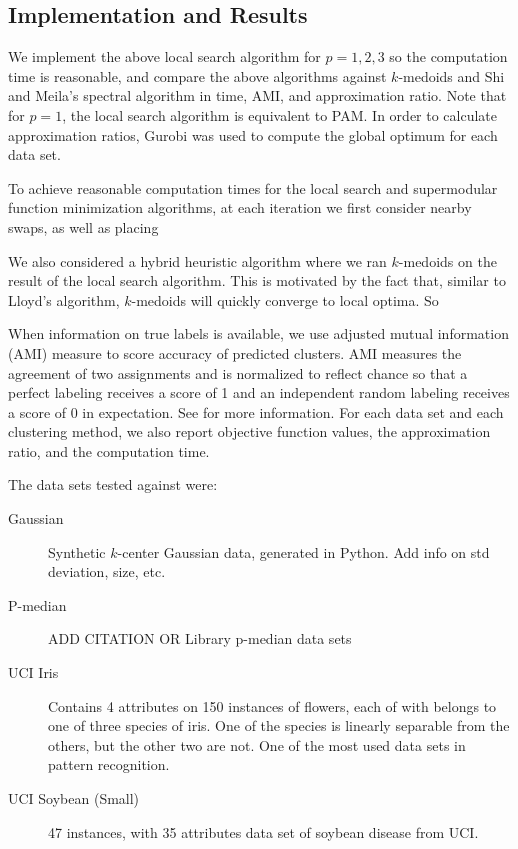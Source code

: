 \documentclass{article}
\begin{document}
\subsection{Implementation and Results}

We implement the above local search algorithm for $p=1, 2, 3$ so the computation time is reasonable, and compare the above algorithms against $k$-medoids and Shi and Meila's spectral algorithm in time, AMI, and approximation ratio.  Note that for $p=1$, the local search algorithm is equivalent to PAM.  In order to calculate approximation ratios, Gurobi was used to compute the global optimum for each data set.

To achieve reasonable computation times for the local search and supermodular function minimization algorithms, at each iteration we first consider nearby swaps, as well as placing 

We also considered a hybrid heuristic algorithm where we ran $k$-medoids on the result of the local search algorithm.  This is motivated by the fact that, similar to Lloyd's algorithm, $k$-medoids will quickly converge to local optima.  So 

When information on true labels is available, we use adjusted mutual information (AMI) measure to score accuracy of predicted clusters. AMI measures the agreement of two assignments and is normalized to reflect chance so that a perfect labeling receives a score of 1 and an independent random labeling receives a score of 0 in expectation.  See \cite{Vinh} for more information. For each data set and each clustering method, we also report objective function values, the approximation ratio, and the computation time. 

The data sets tested against were:
\begin{description}
\item[Gaussian] Synthetic $k$-center Gaussian data, generated in Python.  Add info on std deviation, size, etc.
\item[P-median] ADD CITATION OR Library p-median data sets
\item[UCI Iris] \cite{Iris} Contains 4 attributes on 150 instances of flowers, each of with belongs to one of three species of iris.  One of the species is linearly separable from the others, but the other two are not.  One of the most used data sets in pattern recognition.
\item[UCI Soybean (Small)] \cite{Soybean} 47 instances, with 35 attributes data set of soybean disease from UCI.
\end{description} 
\end{document}
